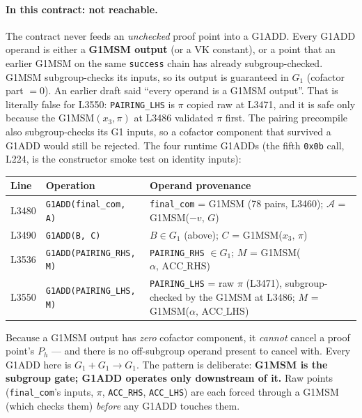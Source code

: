 \paragraph{In this contract: not reachable.}
The contract never feeds an \emph{unchecked} proof point into a
G1ADD. Every G1ADD operand is either a \textbf{G1MSM output} (or a VK
constant), or a point that an earlier G1MSM on the same
\texttt{success} chain has already subgroup-checked. G1MSM
subgroup-checks its inputs, so its output is guaranteed in $G_1$
(cofactor part $= 0$).  An earlier draft said
``every operand is a G1MSM output''. That is literally false for L3550:
\texttt{PAIRING\_LHS} is $\pi$ copied raw at L3471, and it is safe only
because the G1MSM$(x_3,\pi)$ at L3486 validated $\pi$ first. The
pairing precompile also subgroup-checks its G1 inputs, so a cofactor
component that survived a G1ADD would still be rejected. The four runtime
G1ADDs (the fifth \texttt{0x0b} call, L224, is the constructor
smoke test on identity inputs):
\begin{center}\small
\begin{tabular}{@{}llp{8.2cm}@{}}
\toprule
\textbf{Line} & \textbf{Operation} & \textbf{Operand provenance} \\
\midrule
L3480 & \texttt{G1ADD(final\_\allowbreak{}com, A)} & \texttt{final\_com} = G1MSM (78 pairs, L3460); $\mathcal{A}$ = G1MSM($-v,\,G$) \\
L3490 & \texttt{G1ADD(B, C)} & $B \in G_1$ (above); $C$ = G1MSM($x_3,\,\pi$) \\
L3536 & \texttt{G1ADD(PAIRING\_\allowbreak{}RHS, M)} & \texttt{PAIRING\_RHS} $\in G_1$; $M$ = G1MSM($\alpha,\,\text{ACC\_RHS}$) \\
L3550 & \texttt{G1ADD(PAIRING\_\allowbreak{}LHS, M)} & \texttt{PAIRING\_LHS} = raw $\pi$ (L3471), subgroup-checked by the G1MSM at L3486; $M$ = G1MSM($\alpha,\,\text{ACC\_LHS}$) \\
\bottomrule
\end{tabular}
\end{center}
Because a G1MSM output has \emph{zero} cofactor component, it
\emph{cannot} cancel a proof point's $P_h$ --- and there is no
off-subgroup operand present to cancel with. Every G1ADD here is
$G_1 + G_1 \to G_1$. The pattern is deliberate: \textbf{G1MSM
is the subgroup gate; G1ADD operates only downstream of it.} Raw
points (\texttt{final\_com}'s inputs, $\pi$, \texttt{ACC\_RHS},
\texttt{ACC\_LHS}) are each forced through a G1MSM (which checks
them) \emph{before} any G1ADD touches them.

